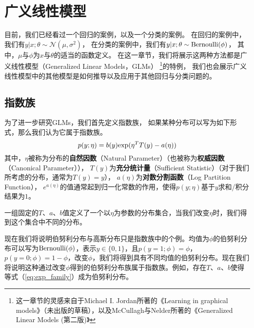 \chapter{广义线性模型}

目前，我们已经看过一个回归的案例，以及一个分类的案例。
在回归的案例中，我们有$y|x;\theta \sim \mathcal{N}(\mu,\sigma^2)$，
在分类的案例中，我们有$y|x;\theta \sim {\rm Bernoulli}(\phi)$，
其中，$\mu$与$\phi$为$x$与$\theta$的适当的函数定义。
在这一章节，我们将展示这两种方法都是广义线性模型（Generalized Linear Models，GLMs）
\footnote{这一章节的灵感来自于Michael I. Jordan所著的《Learning in graphical models》（未出版的草稿），以及McCullagh与Nelder所著的《Generalized Linear Models (第二版)》}的特例，
我们也会展示广义线性模型中的其他模型是如何推导以及应用于其他回归与分类问题的。

\section{指数族}

为了进一步研究GLMs，我们首先定义指数族，
如果某种分布可以写为如下形式，那么我们认为它属于指数族。
\begin{equation}
  p(y;\eta)=b(y){\rm exp}(\eta^T T(y) - a(\eta))
  \label{eq:exp_family}
\end{equation}
其中，$\eta$被称为分布的\textbf{自然因数}（Natural Parameter）（也被称为\textbf{权威因数}（Canonical Parameter）），
$T(y)$为\textbf{充分统计量}（Sufficient Statistic）（对于我们所考虑的分布，通常为$T(y)=y$），
$a(\eta)$为\textbf{对数分割函数}（Log Partition Function），
$e^{a(\eta)}$的值通常起到归一化常数的作用，使得$p(y;\eta)$基于$y$求和/积分结果为$1$。

一组固定的$T$、$a$、$b$值定义了一个以$\eta$为参数的分布集合，当我们改变$\eta$时，我们得到这个集合中不同的分布。

现在我们将说明伯努利分布与高斯分布只是指数族中的个例。均值为$\phi$的伯努利分布可以写为${\rm Bernoulli}(\phi)$，表示$y \in \{0,1\}$，且$p(y=1;\phi)=\phi$，$p(y=0;\phi)=1-\phi$，改变$\phi$，我们将得到具有不同均值的伯努利分布。现在我们将说明这种通过改变$\phi$得到的伯努利分布族属于指数族。例如，存在$T$、$a$、$b$使得等式（\ref{eq:exp_family}）成为伯努利分布。


